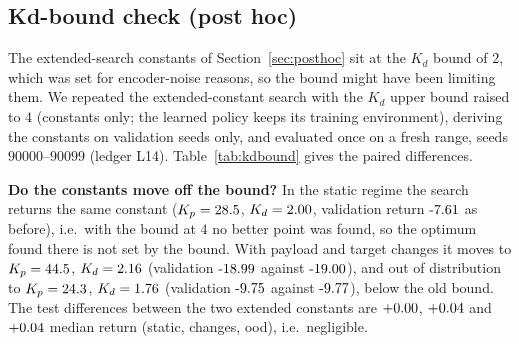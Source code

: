 


\subsection{Kd-bound check (post hoc)}\label{app:kdbound}
The extended-search constants of Section~\ref{sec:posthoc} sit at the $K_d$ bound of $2$, which was set for encoder-noise reasons, so the bound might have been limiting them. We repeated the extended-constant search with the $K_d$ upper bound raised to $4$ (constants only; the learned policy keeps its training environment), deriving the constants on validation seeds only, and evaluated once on a fresh range, seeds $90000$--$90099$ (ledger L14). Table~\ref{tab:kdbound} gives the paired differences.

\textbf{Do the constants move off the bound?} In the static regime the search returns the same constant ($K_p=28.5$, $K_d=2.00$, validation return $\KdBoundStaticValFour$ as before), i.e.\ with the bound at $4$ no better point was found, so the optimum found there is not set by the bound. With payload and target changes it moves to $K_p=44.5$, $K_d=2.16$ (validation $\KdBoundChangesValFour$ against $\KdBoundChangesValTwo$), and out of distribution to $K_p=24.3$, $K_d=1.76$ (validation $\KdBoundOodValFour$ against $\KdBoundOodValTwo$), below the old bound. The test differences between the two extended constants are $+0.00$, $+0.04$ and $+0.04$ median return (static, changes, ood), i.e.\ negligible.

